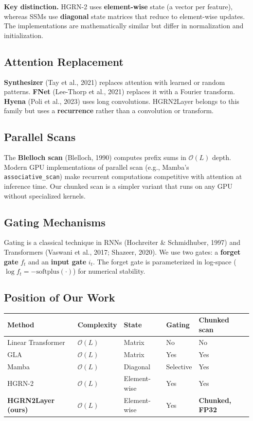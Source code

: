 \textbf{Key distinction.} HGRN-2 uses \textbf{element-wise} state (a vector per 
feature), whereas SSMs use \textbf{diagonal} state matrices that reduce to 
element-wise updates. The implementations are mathematically similar but 
differ in normalization and initialization.

\subsection{Attention Replacement}

\textbf{Synthesizer} (Tay et al., 2021) replaces attention with learned or 
random patterns. \textbf{FNet} (Lee-Thorp et al., 2021) replaces it with a 
Fourier transform. \textbf{Hyena} (Poli et al., 2023) uses long convolutions. 
HGRN2Layer belongs to this family but uses a \textbf{recurrence} rather than a 
convolution or transform.

\subsection{Parallel Scans}

The \textbf{Blelloch scan} (Blelloch, 1990) computes prefix sums in $\mathcal{O}(L)$ 
depth. Modern GPU implementations of parallel scan (e.g., Mamba's \texttt{associative\_scan}) 
make recurrent computations competitive with attention at inference time. Our 
chunked scan is a simpler variant that runs on any GPU without specialized 
kernels.

\subsection{Gating Mechanisms}

Gating is a classical technique in RNNs (Hochreiter \& Schmidhuber, 1997) and 
Transformers (Vaswani et al., 2017; Shazeer, 2020). We use two gates: a 
\textbf{forget gate} $f_t$ and an \textbf{input gate} $i_t$. The forget gate is 
parameterized in log-space ($\log f_t = -\text{softplus}(\cdot)$) for 
numerical stability.

\subsection{Position of Our Work}

\begin{table}[H]
\centering
\small
\begin{tabular}{lllll}
\toprule
\textbf{Method} & \textbf{Complexity} & \textbf{State} & \textbf{Gating} & \textbf{Chunked scan} \\
\midrule
Linear Transformer & $\mathcal{O}(L)$ & Matrix & No & No \\
GLA & $\mathcal{O}(L)$ & Matrix & Yes & Yes \\
Mamba & $\mathcal{O}(L)$ & Diagonal & Selective & Yes \\
HGRN-2 & $\mathcal{O}(L)$ & Element-wise & Yes & Yes \\
\textbf{HGRN2Layer (ours)} & $\mathcal{O}(L)$ & Element-wise & Yes & \textbf{Chunked, FP32} \\
\bottomrule
\end{tabular}
\end{table}



